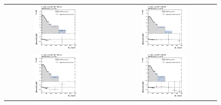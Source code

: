 \begin{figure}[h]
  \centering
  \begin{tabular}{cc}
                \includegraphics[width=0.45\textwidth]{figures/MHT_JetBin2_HTlow_madgraph_DR53X_chs_TuneZ2star_pt10_withoutPUReweighting_UseRebCorrection_v1.png} &
                \includegraphics[width=0.45\textwidth]{figures/MHT_JetBin2_HThigh_madgraph_DR53X_chs_TuneZ2star_pt10_withoutPUReweighting_UseRebCorrection_v1.png}\\
                \includegraphics[width=0.45\textwidth]{figures/MHT_JetBin3_HTlow_madgraph_DR53X_chs_TuneZ2star_pt10_withoutPUReweighting_UseRebCorrection_v1.png} &
                \includegraphics[width=0.45\textwidth]{figures/MHT_JetBin3_HThigh_madgraph_DR53X_chs_TuneZ2star_pt10_withoutPUReweighting_UseRebCorrection_v1.png}\\

\end{tabular}
\end{figure}
